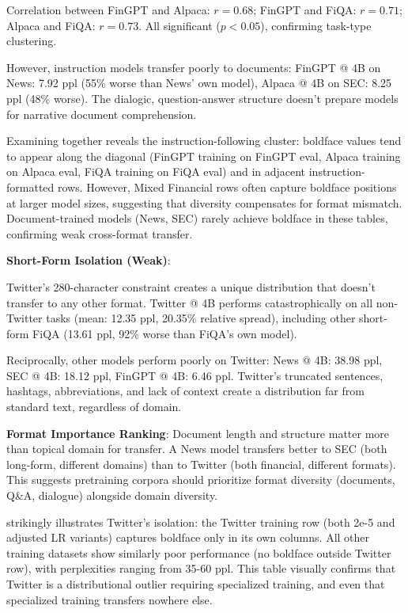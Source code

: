 Correlation between FinGPT and Alpaca: $r = 0.68$; FinGPT and FiQA: $r = 0.71$; Alpaca and FiQA: $r = 0.73$. All significant ($p < 0.05$), confirming task-type clustering.

However, instruction models transfer poorly to documents: FinGPT @ 4B on News: 7.92 ppl (55\% worse than News' own model), Alpaca @ 4B on SEC: 8.25 ppl (48\% worse). The dialogic, question-answer structure doesn't prepare models for narrative document comprehension.







Examining  together reveals the instruction-following cluster: boldface values tend to appear along the diagonal (FinGPT training on FinGPT eval, Alpaca training on Alpaca eval, FiQA training on FiQA eval) and in adjacent instruction-formatted rows. However, Mixed Financial rows often capture boldface positions at larger model sizes, suggesting that diversity compensates for format mismatch. Document-trained models (News, SEC) rarely achieve boldface in these tables, confirming weak cross-format transfer.

\textbf{Short-Form Isolation (Weak)}:

Twitter's 280-character constraint creates a unique distribution that doesn't transfer to any other format. Twitter @ 4B performs catastrophically on all non-Twitter tasks (mean: 12.35 ppl, 20.35\% relative spread), including other short-form FiQA (13.61 ppl, 92\% worse than FiQA's own model).

Reciprocally, other models perform poorly on Twitter: News @ 4B: 38.98 ppl, SEC @ 4B: 18.12 ppl, FinGPT @ 4B: 6.46 ppl. Twitter's truncated sentences, hashtags, abbreviations, and lack of context create a distribution far from standard text, regardless of domain.

\textbf{Format Importance Ranking}: Document length and structure matter more than topical domain for transfer. A News model transfers better to SEC (both long-form, different domains) than to Twitter (both financial, different formats). This suggests pretraining corpora should prioritize format diversity (documents, Q\&A, dialogue) alongside domain diversity.



 strikingly illustrates Twitter's isolation: the Twitter training row (both 2e-5 and adjusted LR variants) captures boldface only in its own columns. All other training datasets show similarly poor performance (no boldface outside Twitter row), with perplexities ranging from 35-60 ppl. This table visually confirms that Twitter is a distributional outlier requiring specialized training, and even that specialized training transfers nowhere else.

